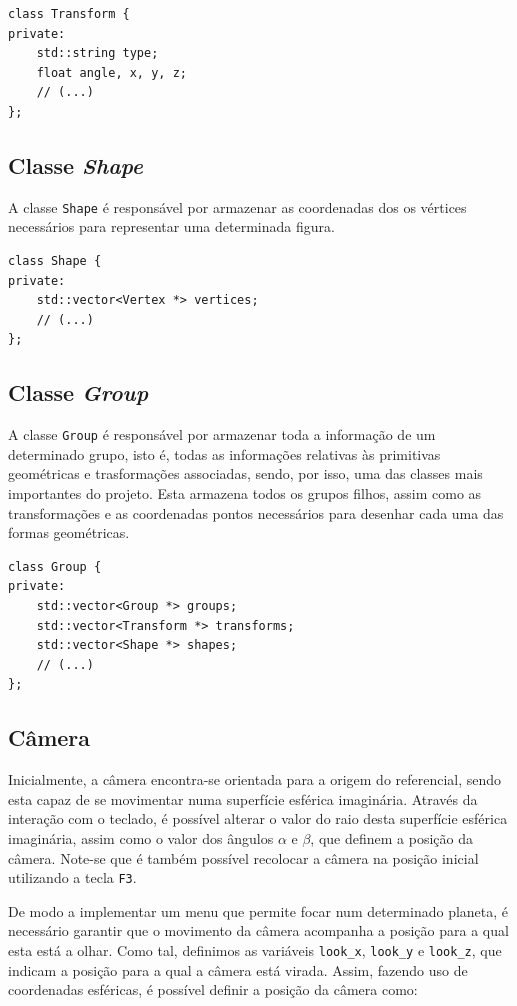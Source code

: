 \documentclass[a4paper, 11pt]{article}
\begin{document}
\begin{verbatim}
class Transform {
private:
    std::string type;
    float angle, x, y, z;
    // (...)
};
\end{verbatim}

\subsection{Classe \textit{Shape}}

A classe \texttt{Shape} é responsável por armazenar as coordenadas dos os vértices
necessários para representar uma determinada figura.

\begin{verbatim}
class Shape {
private:
    std::vector<Vertex *> vertices;
    // (...)
};
\end{verbatim}

\subsection{Classe \textit{Group}}

A classe \texttt{Group} é responsável por armazenar toda a informação de um determinado
grupo, isto é, todas as informações relativas às primitivas geométricas e trasformações
associadas, sendo, por isso, uma das classes mais importantes do projeto. Esta armazena
todos os grupos filhos, assim como as transformações e as coordenadas pontos necessários
para desenhar cada uma das formas geométricas.

\begin{verbatim}
class Group {
private:
    std::vector<Group *> groups;
    std::vector<Transform *> transforms;
    std::vector<Shape *> shapes;
    // (...)
};
\end{verbatim}

\subsection{Câmera}

Inicialmente, a câmera encontra-se orientada para a origem do referencial, sendo
esta capaz de se movimentar numa superfície esférica imaginária. Através da interação
com o teclado, é possível alterar o valor do raio desta superfície esférica imaginária,
assim como o valor dos ângulos $\alpha$ e $\beta$, que definem a posição da câmera.
Note-se que é também possível recolocar a câmera na posição inicial utilizando a tecla
\texttt{F3}.

De modo a implementar um menu que permite focar num determinado planeta, é necessário
garantir que o movimento da câmera acompanha a posição para a qual esta está a olhar.
Como tal, definimos as variáveis \texttt{look\_x}, \texttt{look\_y} e \texttt{look\_z},
que indicam a posição para a qual a câmera está virada. Assim, fazendo uso de
coordenadas esféricas, é possível definir a posição da câmera como:
\end{document}
